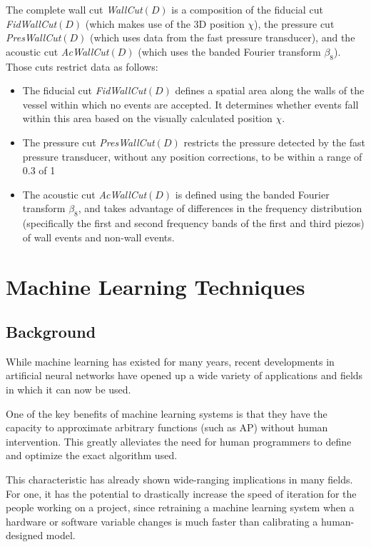 \documentclass[10pt]{article}
\begin{document}
The complete wall cut {\it WallCut}$(D)$ is a composition of the fiducial cut {\it FidWallCut}$(D)$ (which makes use of the 3D position $\chi$), the pressure cut {\it PresWallCut}$(D)$ (which uses data from the fast pressure transducer), and the acoustic cut {\it AcWallCut}$(D)$ (which uses the banded Fourier transform $\beta _{8}$). Those cuts restrict data as follows:

\begin{itemize}
    \item The fiducial cut {\it FidWallCut}$(D)$ defines a spatial area along the walls of the vessel within which no events are accepted. It determines whether events fall within this area based on the visually calculated position $\chi$.
    \item The pressure cut {\it PresWallCut}$(D)$ restricts the pressure detected by the fast pressure transducer, without any position corrections, to be within a range of 0.3 of 1
    \item The acoustic cut {\it AcWallCut}$(D)$ is defined using the banded Fourier transform $\beta_{8}$, and takes advantage of differences in the frequency distribution (specifically the first and second frequency bands of the first and third piezos) of wall events and non-wall events.
\end{itemize}

\section{Machine Learning Techniques}

\subsection{Background}

While machine learning has existed for many years, recent developments in artificial neural networks have opened up a wide variety of applications and fields in which it can now be used.

One of the key benefits of machine learning systems is that they have the capacity to approximate arbitrary functions (such as AP) without human intervention. This greatly alleviates the need for human programmers to define and optimize the exact algorithm used.

This characteristic has already shown wide-ranging implications in many fields. For one, it has the potential to drastically increase the speed of iteration for the people working on a project, since retraining a machine learning system when a hardware or software variable changes is much faster than calibrating a human-designed model.
\end{document}
